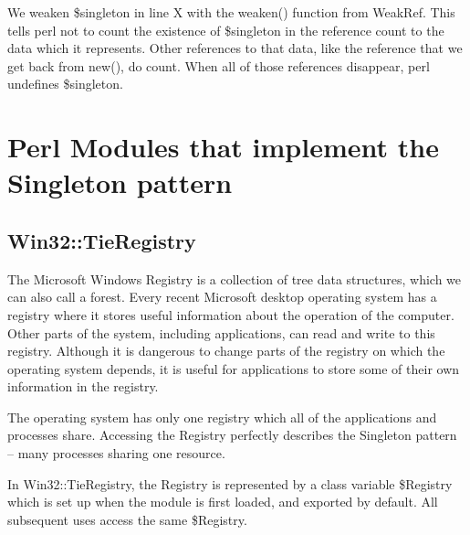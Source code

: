 We weaken \$singleton in line X with the weaken() function
from WeakRef.  This tells perl not to count the existence of
\$singleton in the reference count to the data which it
represents.  Other references to that data, like the
reference that we get back from new(), do count.  When all
of those references disappear, perl undefines \$singleton.

\section{Perl Modules that implement the Singleton pattern}

\subsection{Win32::TieRegistry}

The Microsoft Windows Registry is a collection of tree data structures,
which we can also call a forest.  Every recent Microsoft desktop
operating system has a registry where it stores useful information about
the operation of the computer.  Other parts of the system, including applications,
can read and write to this registry.  Although it is dangerous to change parts
of the registry on which the operating system depends, it is useful for applications
to store some of their own information in the registry.

The operating system has only one registry which all of the applications and processes
share.  Accessing the Registry perfectly describes the Singleton pattern -- many
processes sharing one resource.

In Win32::TieRegistry, the Registry is represented by a class variable
\$Registry which is set up when the module is first loaded, and exported
by default. All subsequent uses access the same \$Registry.
